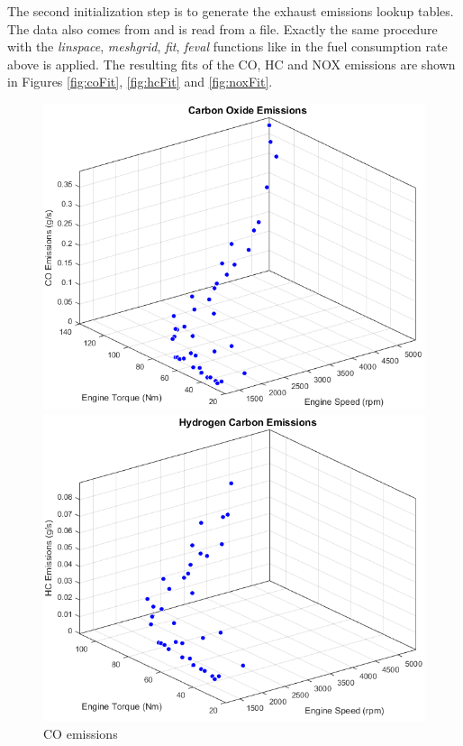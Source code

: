 The second initialization step is to generate the exhaust emissions lookup tables. The data also comes from \citet{argonne1999} and is read from a file. Exactly the same procedure with the \textit{linspace}, \textit{meshgrid}, \textit{fit}, \textit{feval} functions like in the fuel consumption rate above is applied. The resulting fits of the CO, HC and NOX emissions are shown in Figures \ref{fig:coFit}, \ref{fig:hcFit} and \ref{fig:noxFit}.

\begin{figure}[!htb]
  \includegraphics[scale=0.29]{figures/CO}
  \captionsetup{labelsep=space,justification=justified,singlelinecheck=off}
  \caption{CO emissions}\label{fig:awesome_image1}
\endminipage\hfill
{}
  \includegraphics[scale=0.29]{figures/HC}

\end{figure}
